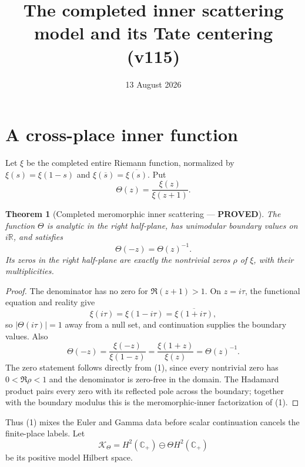 \documentclass[11pt]{article}
\title{The completed inner scattering model and its Tate centering (v115)}
\date{13 August 2026}
\newcommand{\PROVED}{\textcolor{green!40!black}{\textbf{PROVED}}}
\newtheorem{theorem}{Theorem}
\begin{document}
\maketitle

\section{A cross-place inner function}

Let $\xi$ be the completed entire Riemann function, normalized by
$\xi(s)=\xi(1-s)$ and $\xi(\overline s)=\overline{\xi(s)}$.  Put
\begin{equation}
                         \Theta(z)=\frac{\xi(z)}{\xi(z+1)}.    \tag{1}
\end{equation}

\begin{theorem}[Completed meromorphic inner scattering --- \PROVED]
The function $\Theta$ is analytic in the right half-plane, has unimodular
boundary values on $i\mathbb R$, and satisfies
\begin{equation}
                         \Theta(-z)=\Theta(z)^{-1}.             \tag{2}
\end{equation}
Its zeros in the right half-plane are exactly the nontrivial zeros $\rho$
of $\xi$, with their multiplicities.
\end{theorem}

\begin{proof}
The denominator has no zero for $\Re(z+1)>1$.  On $z=i\tau$, the functional
equation and reality give
\[
 \xi(i\tau)=\xi(1-i\tau)=\overline{\xi(1+i\tau)},
\]
so $|\Theta(i\tau)|=1$ away from a null set, and continuation supplies the
boundary values.  Also
\[
 \Theta(-z)=\frac{\xi(-z)}{\xi(1-z)}
            =\frac{\xi(1+z)}{\xi(z)}=\Theta(z)^{-1}.
\]
The zero statement follows directly from (1), since every nontrivial zero
has $0<\Re\rho<1$ and the denominator is zero-free in the domain.  The
Hadamard product pairs every zero with its reflected pole across the
boundary; together with the boundary modulus this is the meromorphic-inner
factorization of (1).
\end{proof}

Thus (1) mixes the Euler and Gamma data before scalar continuation cancels
the finite-place labels.  Let
\begin{equation}
 \mathscr K_\Theta=H^2(\mathbb C_+)\ominus\Theta H^2(\mathbb C_+)          \tag{3}
\end{equation}
be its positive model Hilbert space.
\end{document}

